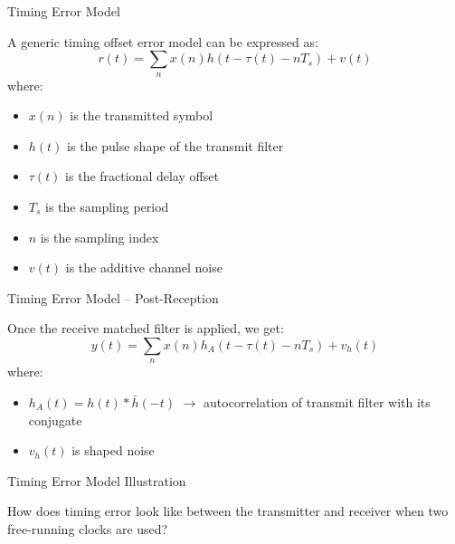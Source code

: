 \documentclass[10pt]{beamer}
\begin{document}
\begin{frame}[fragile]{Timing Error Model}
 
A generic timing offset error model can be expressed as:
\begin{equation}
 r(t)=\sum\limits_{n}x(n)h(t-\tau(t)-nT_s)+v(t)
\end{equation}
where:
\begin{itemize}
 \item $x(n)$ is the transmitted symbol
 \item $h(t)$ is the pulse shape of the transmit filter
 \item $\tau(t)$ is the fractional delay offset
 \item $T_s$ is the sampling period
 \item $n$ is the sampling index
 \item $v(t)$ is the additive channel noise
\end{itemize}


\end{frame}



\begin{frame}[fragile]{Timing Error Model -- Post-Reception}

Once the receive matched filter is applied, we get:
\begin{equation}
 y(t)=\sum\limits_{n}x(n)h_A(t-\tau(t)-nT_s)+v_h(t)
\end{equation}
where:
\begin{itemize}
 \item $h_A(t)=h(t)\ast{\bar{h}(-t)}$ $\rightarrow$ autocorrelation of transmit filter with its conjugate
 \item $v_h(t)$ is shaped noise
\end{itemize}

 
\end{frame}


\begin{frame}[fragile]{Timing Error Model Illustration}

How does timing error look like between the transmitter and receiver when two free-running clocks are used?
 
\end{frame}


\end{document}
